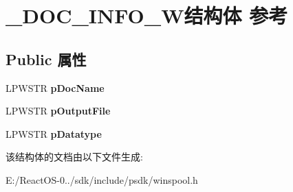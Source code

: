 \hypertarget{struct___d_o_c___i_n_f_o__1_w}{}\section{\+\_\+\+D\+O\+C\+\_\+\+I\+N\+F\+O\+\_\+W结构体 参考}
\label{struct___d_o_c___i_n_f_o__1_w}
\subsection*{Public 属性}
\begin{DoxyCompactItemize}
\item 
\mbox{\label{struct___d_o_c___i_n_f_o__1_w_ab1bb6ddff32884da69d643e4833d847e}} 
L\+P\+W\+S\+TR {\bfseries p\+Doc\+Name}
\item 
\mbox{\label{struct___d_o_c___i_n_f_o__1_w_a0234c87403c3de2b3af6305a3b99f946}} 
L\+P\+W\+S\+TR {\bfseries p\+Output\+File}
\item 
\mbox{\label{struct___d_o_c___i_n_f_o__1_w_a2d55f7efd9aadcc35ec02501cb1164cc}} 
L\+P\+W\+S\+TR {\bfseries p\+Datatype}
\end{DoxyCompactItemize}


该结构体的文档由以下文件生成\+:\begin{DoxyCompactItemize}
\item 
E\+:/\+React\+O\+S-\/0../sdk/include/psdk/winspool.\+h\end{DoxyCompactItemize}
